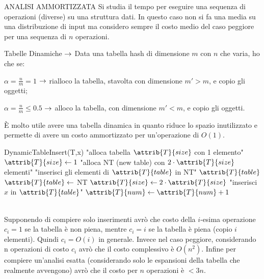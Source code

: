 \documentclass[8pt]{extarticle}
\begin{document}
\begin{formulario}
		\begin{myParagraph}{ANALISI AMMORTIZZATA}
Si studia il tempo per eseguire una sequenza di operazioni (diverse) su una struttura dati. In questo caso non si fa una media su una distribuzione di input ma considero sempre il costo medio del caso peggiore per una sequenza di $n$ operazioni.
			\begin{descr}{0}
				\item[Tabelle Dinamiche] $\rightarrow$ Data una tabella hash di dimensione $m$ con $n$ che varia, ho che se:
				\begin{descr}{0}
					\item[$\alpha=\frac{n}{m}=1$] $\rightarrow$ rialloco la tabella, stavolta con dimensione $m'>m$, e copio gli oggetti;
					\item[$\alpha=\frac{n}{m}\leq0.5$] $\rightarrow$ alloco la tabella, con dimensione $m'<m$, e copio gli oggetti.
				\end{descr}
È molto utile avere una tabella dinamica in quanto riduce lo spazio inutilizzato e permette di avere un costo ammortizzato per un'operazione di $O(1)$.
				\begin{code}{DynamicTableInsert(T,x)}
\li {}
	\li "alloca tabella $\attrib{T}{size}$ con 1 elemento"
	\li $\attrib{T}{size} \la 1$
\End
\li {}
	\li "alloca NT (new table) con $2\cdot \attrib{T}{size}$ elementi"
	\li "inserisci gli elementi di $\attrib{T}{table}$ in NT"
	\li {} $\attrib{T}{table}$
	\li $\attrib{T}{table}\la$ NT
	\li $\attrib{T}{size}\la 2\cdot\attrib{T}{size}$
\End
\li "inserisci $x$ in $\attrib{T}{table}$"
\li $\attrib{T}{num}\la \attrib{T}{num}+1$
				\end{code}
			\end{descr}
\\
Supponendo di compiere solo inserimenti avrò che costo della $i$-esima operazione $c_i=1$ se la tabella è non piena, mentre $c_i=i$ se la tabella è piena (copio $i$ elementi). Quindi $c_i=O(i)$ in generale. Invece nel caso peggiore, considerando n operazioni di costo $c_i$ avrò che il costo complessivo è $O(n^2)$. Infine per compiere un'analisi esatta (considerando solo le espansioni della tabella che realmente avvengono) avrò che il costo per $n$ operazioni è $<3n$.
		\end{myParagraph}


\end{formulario}
\end{document}
